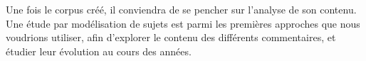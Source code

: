 \documentclass[11pt,french]{article}
\begin{document}
Une fois le corpus créé, il conviendra de se pencher sur l'analyse de son contenu. Une étude par modélisation de sujets est parmi les premières approches que nous voudrions utiliser, afin d'explorer le contenu des différents commentaires, et étudier leur évolution au cours des années.

 
\end{document}
